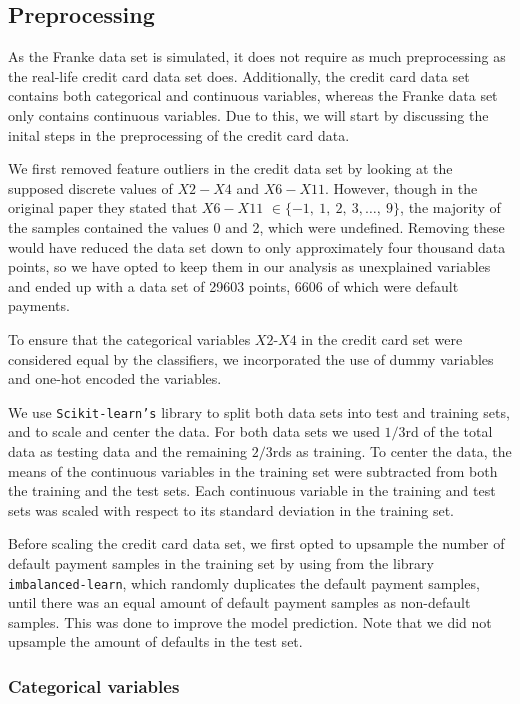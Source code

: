 \documentclass[a4paper, 11pt, twocolumn]{article}
\begin{document}
\subsection{Preprocessing}
As the Franke data set is simulated, it does not require as much preprocessing as
the real-life credit card data set does. Additionally, the credit card data set
contains both categorical and continuous variables, whereas the Franke data set
only contains continuous variables. Due to this, we will start by discussing the
inital steps in the preprocessing of the credit card data.

We first removed feature outliers in the credit data set by looking at the supposed
discrete values of $X2-X4$ and $X6-X11$. However, though in the original paper
they stated that $X6-X11$ $\in\{-1,\ 1,\ 2,\ 3,\dots,\ 9\}$, the majority of
the samples contained the values 0 and 2, which were undefined. Removing these
would have reduced the data set down to only approximately four thousand data
points, so we have opted to keep them in our analysis as unexplained variables
and ended up with a data set of 29603 points, 6606 of which were default payments.

To ensure that the categorical variables $X2$-$X4$ in the credit card set were
considered equal by the classifiers, we incorporated the use of dummy variables
and one-hot encoded the variables.

We use \texttt{Scikit-learn's}\cite{sklearn_api} library to split both data sets
into test and training sets, and to scale and center the data.
For both data sets we used $1/3$rd of the total data as testing data
and the remaining $2/3$rds as training. To center the data, the means of the
continuous variables in the training set were subtracted from both the training
and the test sets. Each continuous variable in the training and test sets was
scaled with respect to its standard deviation in the training set.

Before scaling the credit card data set, we first opted to upsample the number of
default payment samples in the training set by using 
from the library \texttt{imbalanced-learn}, which randomly duplicates the default
payment samples, until there was an equal amount of default payment samples as
non-default samples. This was done to improve the model prediction. Note that we
did not upsample the amount of defaults in the test set.


\subsubsection{Categorical variables}
\end{document}
